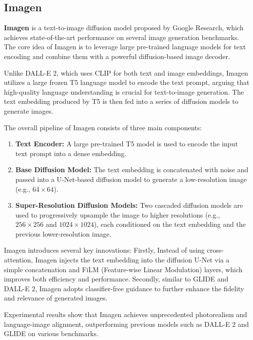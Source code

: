\documentclass{article}
\begin{document}
\subsection{Imagen}

\textbf{Imagen} is a text-to-image diffusion model proposed by Google Research, which achieves 
state-of-the-art performance on several image generation benchmarks. The core idea of Imagen is to leverage 
large pre-trained language models for text encoding and combine them with a powerful diffusion-based image 
decoder.

Unlike DALL-E 2, which uses CLIP for both text and image embeddings, Imagen utilizes a large frozen T5 
language model to encode the text prompt, arguing that high-quality language understanding is crucial for 
text-to-image generation. The text embedding produced by T5 is then fed into a series of diffusion models to 
generate images.

The overall pipeline of Imagen consists of three main components:
\begin{enumerate}
    \item \textbf{Text Encoder:} A large pre-trained T5 model is used to encode the input text prompt into a 
    dense embedding.
    \item \textbf{Base Diffusion Model:} The text embedding is concatenated with noise and passed into a 
    U-Net-based diffusion model to generate a low-resolution image (e.g., $64 \times 64$).
    \item \textbf{Super-Resolution Diffusion Models:} Two cascaded diffusion models are used to progressively 
    upsample the image to higher resolutions (e.g., $256 \times 256$ and $1024 \times 1024$), each 
    conditioned on the text embedding and the previous lower-resolution image.
\end{enumerate}

Imagen introduces several key innovations: Firstly, Instead of using cross-attention, Imagen injects the text 
embedding into the diffusion U-Net via a simple concatenation and FiLM (Feature-wise Linear Modulation) 
layers, which improves both efficiency and performance. Secondly, similar to GLIDE and DALL-E 2, Imagen adopts classifier-free 
guidance to further enhance the fidelity and relevance of generated images.

Experimental results show that Imagen achieves unprecedented photorealism and language-image alignment, 
outperforming previous models such as DALL-E 2 and GLIDE on various benchmarks. 
\end{document}
